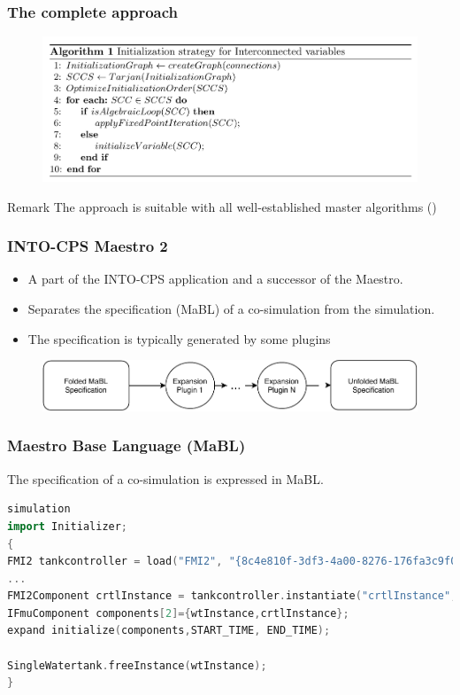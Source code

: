 \documentclass{beamer}
\begin{document}
\begin{frame}[fragile]
\frametitle{The complete approach}
\begin{figure}
    \centering
    \includegraphics[scale=0.25]{images/Screenshot 2020-09-09 at 09.12.56.png}
\end{figure}

\begin{block}{Remark} 
    The approach is suitable with all well-established master algorithms ()
\end{block}
\end{frame}


\begin{frame}
\frametitle{INTO-CPS Maestro 2}
\begin{itemize}
    \item A part of the INTO-CPS application and a successor of the Maestro.    
    \item Separates the specification (MaBL) of a co-simulation from the simulation.
    \item The specification is typically generated by some plugins
\end{itemize}
\begin{figure}
    \centering
    \includegraphics[scale=0.6]{images/ExpansionPlugin-Page-1.pdf}
    \label{fig:my_label}
\end{figure}
\end{frame}


\begin{frame}[fragile]
\frametitle{Maestro Base Language (MaBL)}
The specification of a co-simulation is expressed in MaBL.

\begin{lstlisting}[language=C++]
simulation
import Initializer;
{
FMI2 tankcontroller = load("FMI2", "{8c4e810f-3df3-4a00-8276-176fa3c9f000}", "src/test/resources/watertankcontroller-c.fmu");
...
FMI2Component crtlInstance = tankcontroller.instantiate("crtlInstance", false, false);;
IFmuComponent components[2]={wtInstance,crtlInstance};
expand initialize(components,START_TIME, END_TIME);

SingleWatertank.freeInstance(wtInstance);
}
\end{lstlisting}
\end{frame}
\end{document}
